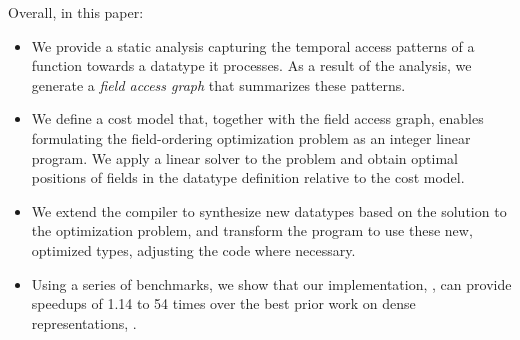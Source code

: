 
Overall, in this paper:
\begin{itemize}
\item We provide a static analysis capturing the temporal access patterns of a
  function towards a datatype it processes. As a result of the analysis, we
  generate a {\em field access graph} that summarizes these patterns.

\item We define a cost model that, together with the field access graph, enables
  formulating the field-ordering optimization problem as an integer linear program.
  We apply a %
  linear solver to the problem and obtain optimal positions of fields in the
  datatype definition relative to the cost model.
  
\item We extend the \gibbon{} compiler to synthesize new datatypes based on the
solution to the optimization problem, and transform the program to use these new,
optimized types, adjusting the code where necessary.
  
\item Using a series of benchmarks, we show that our implementation, \system,
  can provide speedups of 1.14
  to 54 times
  over the best prior work on dense representations, \gibbon.
%
%

\end{itemize}



